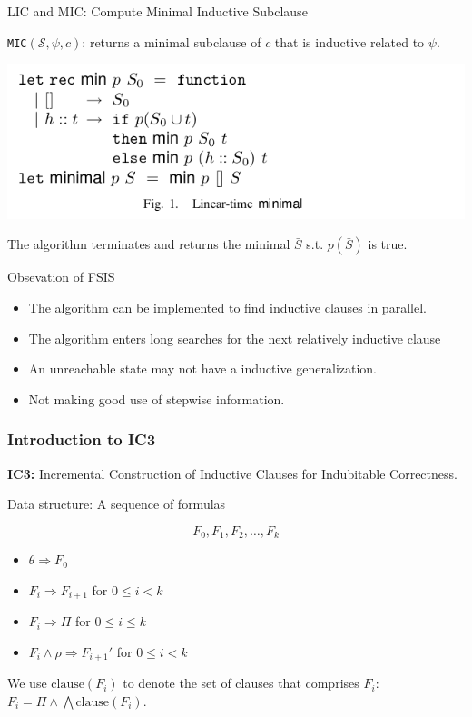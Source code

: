 \documentclass[aspectratio=1610, 13pt]{beamer}
\begin{document}
\begin{frame}{LIC and MIC: Compute Minimal Inductive Subclause}

\texttt{MIC}$(\mathcal{S}, \psi, c)$: returns a minimal subclause of $c$ that is inductive related to $\psi$.

\begin{center}
\includegraphics[scale=0.4]{pic1.png}
\end{center}

\begin{theorem}[Correct]
The algorithm terminates and returns the minimal $\bar{S}$ s.t. $p(\bar{S})$ is true.
\end{theorem}
\end{frame}

\begin{frame}{Obsevation of FSIS}
\begin{itemize}
\item The algorithm can be implemented to find inductive clauses in parallel.
\item The algorithm enters long searches for the next relatively inductive clause
\item An unreachable state may not have a inductive generalization.
\item Not making good use of stepwise information.
\end{itemize}
\end{frame}

\begin{frame}\frametitle{Introduction to IC3}
\begin{center}

\textbf{IC3:} Incremental Construction of Inductive Clauses for Indubitable Correctness.
\end{center}


Data structure: A sequence of formulas

\[F_0, F_1, F_2, \ldots, F_k\]


\begin{itemize}
\item $\theta \Rightarrow F_0$
\item $F_i\Rightarrow F_{i + 1}$
for $0\le i < k$
\item $F_i\Rightarrow \Pi$
for $0\le i \le k$
\item $F_i\wedge \rho \Rightarrow F_{i + 1} '$ 
for $0\le i < k$
\end{itemize}

We use $\text{clause}(F_i)$ to denote the set of clauses that comprises $F_i$: $F_i = \Pi \wedge \bigwedge \text{clause}(F_i)$.

\end{frame}
\end{document}
